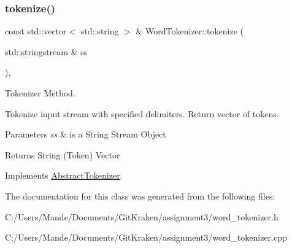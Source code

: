 \subsubsection{\texorpdfstring{tokenize()}{tokenize()}}
{\footnotesize\ttfamily const std\+::vector$<$ std\+::string $>$ \& Word\+Tokenizer\+::tokenize (\begin{DoxyParamCaption}\item[{std\+::stringstream \&}]{ss }\end{DoxyParamCaption})\hspace{0.3cm}{\ttfamily [override]}, {\ttfamily [virtual]}}



Tokenizer Method. 

Tokenize input stream with specified delimiters. Return vector of tokens.


\begin{DoxyParams}{Parameters}
{\em ss} & is a String Stream Object \\
\hline
\end{DoxyParams}
\begin{DoxyReturn}{Returns}
String (Token) Vector 
\end{DoxyReturn}


Implements \hyperlink{class_abstract_tokenizer_a566f425fc415ed1dfefc13706868a3ff}{Abstract\+Tokenizer}.



The documentation for this class was generated from the following files\+:\begin{DoxyCompactItemize}
\item 
C\+:/\+Users/\+Mande/\+Documents/\+Git\+Kraken/assignment3/word\+\_\+tokenizer.\+h\item 
C\+:/\+Users/\+Mande/\+Documents/\+Git\+Kraken/assignment3/word\+\_\+tokenizer.\+cpp\end{DoxyCompactItemize}
